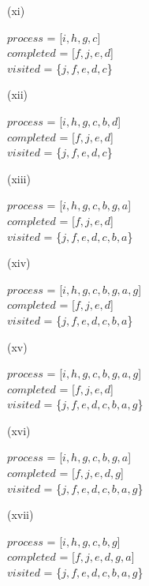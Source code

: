 \documentclass[addpoints]{exam}
\begin{document}
\begin{questions}
\begin{parts}
\begin{solution}
\begin{center}
    	\end{center}
    	(xi)
    	\begin{center}
    		$process$ = [$i, h, g, c$]\\
    		$completed$ = [$f, j, e, d$]\\
    		$visited$ = \{$j, f, e, d, c$\}\\
    	\end{center}
    	(xii)
    	\begin{center}
    		$process$ = [$i, h, g, c, b, d$]\\
    		$completed$ = [$f, j, e, d$]\\
    		$visited$ = \{$j, f, e, d, c$\}\\
    	\end{center}
    	(xiii)
    	\begin{center}
    		$process$ = [$i, h, g, c, b, g, a$]\\
    		$completed$ = [$f, j, e, d$]\\
    		$visited$ = \{$j, f, e, d, c, b, a$\}\\
    	\end{center}
    	(xiv)
    	\begin{center}
    		$process$ = [$i, h, g, c, b, g, a, g$]\\
    		$completed$ = [$f, j, e, d$]\\
    		$visited$ = \{$j, f, e, d, c, b, a$\}\\
    	\end{center}
    	(xv)
    	\begin{center}
    		$process$ = [$i, h, g, c, b, g, a, g$]\\
    		$completed$ = [$f, j, e, d$]\\
    		$visited$ = \{$j, f, e, d, c, b, a, g$\}\\
    	\end{center}
    	(xvi)
    	\begin{center}
    		$process$ = [$i, h, g, c, b, g, a$]\\
    		$completed$ = [$f, j, e, d, g$]\\
    		$visited$ = \{$j, f, e, d, c, b, a, g$\}\\
    	\end{center}
    	(xvii)
    	\begin{center}
    		$process$ = [$i, h, g, c, b, g$]\\
    		$completed$ = [$f, j, e, d, g, a$]\\
    		$visited$ = \{$j, f, e, d, c, b, a, g$\}\\

\end{center}
\end{solution}
\end{parts}
\end{questions}
\end{document}
